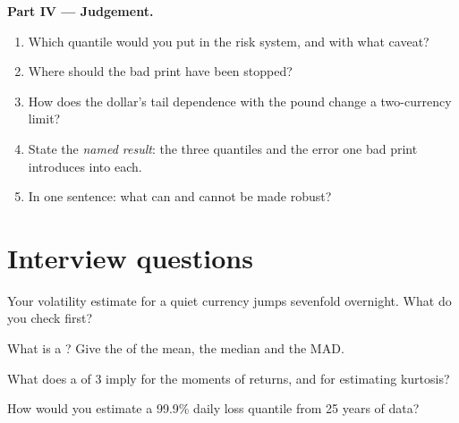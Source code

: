 \begin{problem}
\medskip\noindent\textbf{Part IV --- Judgement.}
\begin{enumerate}[resume]
\item Which quantile would you put in the risk system, and with what caveat?
\item Where should the bad print have been stopped?
\item How does the dollar's tail dependence with the pound change a two-currency limit?
\item State the \emph{named result}: the three quantiles and the error one bad print introduces into each.
\item In one sentence: what can and cannot be made robust?
\end{enumerate}
\end{problem}

\section{Interview questions}

\begin{interviewq}\label{iq:qm:robust-statistics-and-heavy-tails:1}
Your volatility estimate for a quiet currency jumps sevenfold overnight. What do you check first?
\end{interviewq}

\begin{interviewq}\label{iq:qm:robust-statistics-and-heavy-tails:2}
What is a ? Give the  of the mean, the median and the MAD.
\end{interviewq}

\begin{interviewq}\label{iq:qm:robust-statistics-and-heavy-tails:3}
What does a  of 3 imply for the moments of returns, and for estimating kurtosis?
\end{interviewq}

\begin{interviewq}\label{iq:qm:robust-statistics-and-heavy-tails:4}
How would you estimate a 99.9\% daily loss quantile from 25 years of data?
\end{interviewq}

